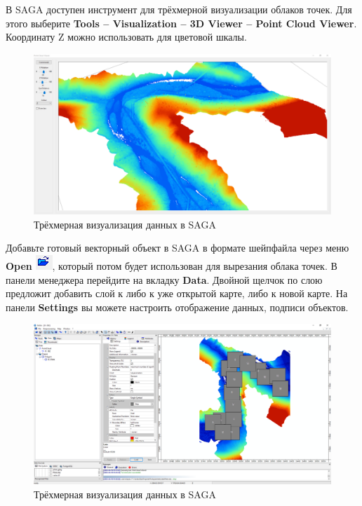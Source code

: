 \documentclass[
  12pt,
]{book}
\begin{document}
В SAGA доступен инструмент для трёхмерной визуализации облаков точек. Для этого выберите \textbf{Tools -- Visualization -- 3D Viewer -- Point Cloud Viewer}. Координату Z можно использовать для цветовой шкалы.

\begin{figure}
\centering
\includegraphics{images/Ref19/Point_Cloud_Viewer.png}
\caption{Трёхмерная визуализация данных в SAGA}
\end{figure}

Добавьте готовый векторный объект в SAGA в формате шейпфайла через меню \textbf{Open} \includegraphics{images/Ref19/Open.png}, который потом будет использован для вырезания облака точек. В панели менеджера перейдите на вкладку \textbf{Data}. Двойной щелчок по слою предложит добавить слой к либо к уже открытой карте, либо к новой карте. На панели \textbf{Settings} вы можете настроить отображение данных, подписи объектов.

\begin{figure}
\centering
\includegraphics{images/Ref19/Vector_Features.png}
\caption{Трёхмерная визуализация данных в SAGA}
\end{figure}
\end{document}
